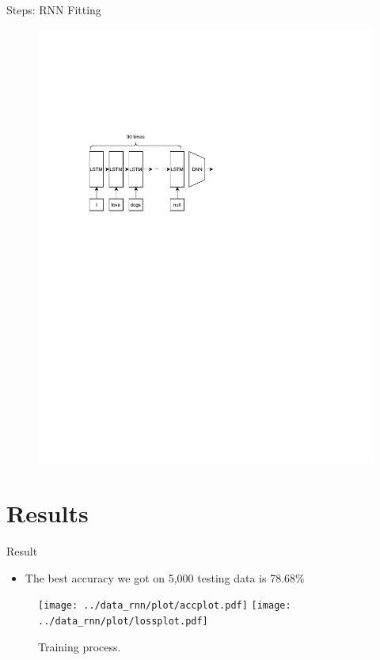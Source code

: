 \documentclass{beamer}
\begin{document}
\begin{frame}{Steps: RNN Fitting}

    \begin{figure}[h]
        \includegraphics[trim={1cm 12cm 0 6cm},clip]{img/rnn.pdf}
    \end{figure}
		
\end{frame}

\section{Results}%
\label{sec:results}
\begin{frame}{Result}
    \begin{itemize}
        \item The best accuracy we got on 5,000 testing data is 78.68\%
    \end{itemize}
    \begin{figure}[h]
        \centering
        \texttt{[image: ../data\_rnn/plot/accplot.pdf]}
        \texttt{[image: ../data\_rnn/plot/lossplot.pdf]}
        \caption{Training process.\label{fig:result}}
    \end{figure}

\end{frame}
\end{document}
